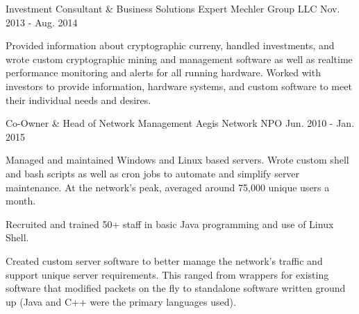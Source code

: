 \begin{cventries}
    \cventry
      {Investment Consultant \& Business Solutions Expert} %
      {Mechler Group LLC} %
      {} %
      {Nov. 2013 - Aug. 2014} %
      {
        \begin{cvitems} %
          \item {Provided information about cryptographic curreny, handled %
          investments, and wrote custom cryptographic mining and management software %
          as well as realtime performance monitoring and alerts for all running %
          hardware. Worked with investors to provide information, %
          hardware systems, and custom software to meet their individual needs %
          and desires.}
        \end{cvitems}
      }

  \cventry
    {Co-Owner \& Head of Network Management} %
    {Aegis Network NPO} %
    {} %
    {Jun. 2010 - Jan. 2015} %
    {
      \begin{cvitems} %
        \item {Managed and maintained Windows and Linux based servers. %
        Wrote custom shell and bash scripts as well as cron jobs to automate %
        and simplify server maintenance. At the network's peak, averaged around %
        75,000 unique users a month.}
        \item {Recruited and trained 50+ staff in basic Java programming and %
        use of Linux Shell.}
        \item {Created custom server software to better manage the network's %
        traffic and support unique server requirements. This ranged from %
        wrappers for existing software that modified packets on the fly to %
        standalone software written ground up (Java and C++ were the primary %
        languages used).}
      \end{cvitems}
    }

\end{cventries}
